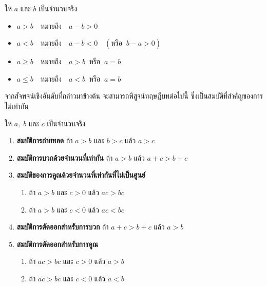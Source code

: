 \begin{definitionbox}
	ให้ $a$ และ $b$ เป็นจำนวนจริง
	\begin{itemize}
		\item $a > b \quad \text{หมายถึง} \quad a - b > 0$
		\item $a < b \quad \text{หมายถึง} \quad a - b < 0 \quad (\text{หรือ} \;\; b - a > 0)$
		\item $a \geq b \quad \text{หมายถึง} \quad a > b \;\; \text{หรือ} \;\; a = b$
		\item $a \leq b \quad \text{หมายถึง} \quad a < b \;\; \text{หรือ} \;\; a = b$
	\end{itemize}
\end{definitionbox}

\vspace{0.5em}
จากสัจพจน์เชิงอันดับที่กล่าวมาข้างต้น จะสามารถพิสูจน์ทฤษฎีบทต่อไปนี้ ซึ่งเป็นสมบัติที่สำคัญของการไม่เท่ากัน
\newpage
\begin{theorembox}
	ให้ $a, \; b$ และ $c$ เป็นจำนวนจริง
	\begin{enumerate}[label=\arabic*., leftmargin=*, itemsep=0.6em]
		\item \textbf{สมบัติการถ่ายทอด} 
		ถ้า $a > b$ และ $b > c$ แล้ว $a > c$
		
		\item \textbf{สมบัติการบวกด้วยจำนวนที่เท่ากัน} 
		ถ้า $a > b$ แล้ว $a + c > b + c$
		\item \textbf{สมบัติของการคูณด้วยจำนวนที่เท่ากันที่ไม่เป็นศูนย์}
		\begin{enumerate}[label=\theenumi\arabic*), leftmargin=*, itemsep=0.6em]
			\item ถ้า $a > b$ และ $c > 0$ แล้ว $ac > bc$ 
			\item ถ้า $a > b$ และ $c < 0$ แล้ว $ac < bc$
		\end{enumerate}
		\item \textbf{สมบัติการตัดออกสำหรับการบวก} 
		ถ้า $a + c > b + c$ แล้ว $a > b$
		\item \textbf{สมบัติการตัดออกสำหรับการคูณ}
		\begin{enumerate}[label=\theenumi\arabic*), leftmargin=*, itemsep=0.6em]
			\item ถ้า $ac > bc$ และ $c > 0$ แล้ว $a > b$ 
			\item ถ้า $ac > bc$ และ $c < 0$ แล้ว $a < b$
		\end{enumerate}
	\end{enumerate}
\end{theorembox}

\vspace{1em}

